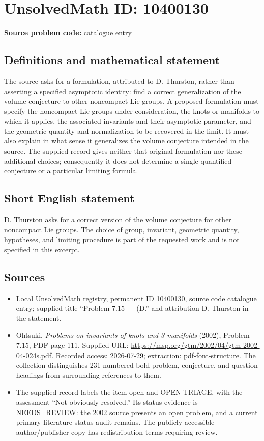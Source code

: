 \documentclass[11pt]{article}
\begin{document}
\section*{UnsolvedMath ID: 10400130}
\textbf{Source problem code:} catalogue entry
\subsection{Definitions and mathematical statement}
The source asks for a formulation, attributed to D. Thurston, rather than asserting a specified asymptotic identity: find a correct generalization of the volume conjecture to other noncompact Lie groups. A proposed formulation must specify the noncompact Lie groups under consideration, the knots or manifolds to which it applies, the associated invariants and their asymptotic parameter, and the geometric quantity and normalization to be recovered in the limit. It must also explain in what sense it generalizes the volume conjecture intended in the source. The supplied record gives neither that original formulation nor these additional choices; consequently it does not determine a single quantified conjecture or a particular limiting formula.
\subsection{Short English statement}
D. Thurston asks for a correct version of the volume conjecture for other noncompact Lie groups. The choice of group, invariant, geometric quantity, hypotheses, and limiting procedure is part of the requested work and is not specified in this excerpt.
\subsection{Sources}
\begin{itemize}
\item Local UnsolvedMath registry, permanent ID 10400130, source code catalogue entry; supplied title ``Problem 7.15 --- (D.'' and attribution D. Thurston in the statement.
\item Ohtsuki, \emph{Problems on invariants of knots and 3-manifolds} (2002), Problem 7.15, PDF page 111. Supplied URL: \url{https://msp.org/gtm/2002/04/gtm-2002-04-024s.pdf}. Recorded access: 2026-07-29; extraction: pdf-font-structure. The collection distinguishes 231 numbered bold problem, conjecture, and question headings from surrounding references to them.
\item The supplied record labels the item open and OPEN-TRIAGE, with the assessment ``Not obviously resolved.'' Its status evidence is NEEDS\_REVIEW: the 2002 source presents an open problem, and a current primary-literature status audit remains. The publicly accessible author/publisher copy has redistribution terms requiring review.
\end{itemize}
\end{document}
